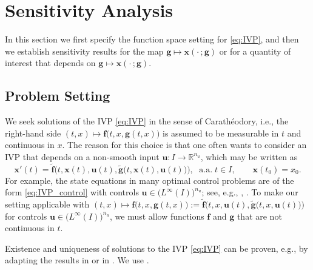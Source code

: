 \documentclass[onefignum,onetabnum]{siamart220329}
\numberwithin{equation}{section}
\newcommand{\aall}{\mbox{ a.a.} \;}
\newcommand {\real} {\mathbb{R}}
\newcommand{\bff}{\ensuremath{\mathbf{f}}} %
\newcommand{\bg}{\ensuremath{\mathbf{g}}} %
\newcommand{\bu}{\ensuremath{\mathbf{u}}} %
\newcommand{\bx}{\ensuremath{\mathbf{x}}} %
\begin{document}
%
\section{Sensitivity Analysis} \label{sec:sensitivity}
In this section we first specify the function space setting for  \cref{eq:IVP}, and then we
establish sensitivity results for the map  $\bg \mapsto \bx(\cdot \, ; \bg)$ or for a quantity of interest
that depends on $\bg \mapsto \bx(\cdot \, ; \bg)$.





\subsection{Problem Setting}   \label{sec:problem_formulation}
We seek solutions of the IVP \cref{eq:IVP} in the sense of Carath\'eodory, i.e., the right-hand side $(t, x) \mapsto \bff\big( t, x, \bg(t, x) \big)$ is assumed to be measurable in $t$ and continuous in $x$.
The reason for this choice is that one often wants to consider an IVP that depends on a non-smooth input $\bu: I \rightarrow \real^{n_u}$, which may be written as
\begin{equation} \label{eq:IVP_control}
	\bx'(t) = \widetilde{\bff}\Big( t, \bx(t), \bu(t), \widetilde{\bg}\big(t, \bx(t), \bu(t) \big) \Big), \; \aall t \in I, \qquad
	\bx(t_0) = x_0.
\end{equation}
For example, the state equations in many optimal control problems are of the form \cref{eq:IVP_control} with
controls $\bu \in \big(L^\infty(I)\big)^{n_u}$; see, e.g., \cite{MGerdts_2012a}, \cite{EPolak_1997}.
To make our setting applicable with 
$(t, x) \mapsto   \bff\big( t, x, \bg(t, x ) \big) := \widetilde{\bff}\big( t, x, \bu(t), \widetilde{\bg}\big(t, x, \bu(t) \big) \big)$
for controls $\bu \in \big(L^\infty(I)\big)^{n_u}$,
we must allow functions $\bff$ and $\bg$ that are not continuous in $t$.

Existence and uniqueness of solutions to the IVP \cref{eq:IVP} can be proven, e.g., by adapting the results
in  \cite[Sec.~1]{AFFilippov_1988a} or in \cite[Sec.~5.6]{EPolak_1997}. We use \cite{AFFilippov_1988a}.
\end{document}
